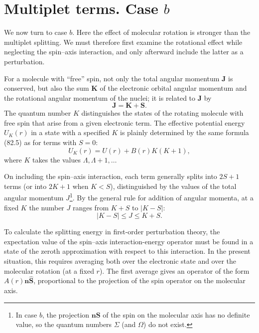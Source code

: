 \section{Multiplet terms. Case $b$}

We now turn to case $b$. Here the effect of molecular rotation is stronger than the multiplet splitting. We must therefore first examine the rotational effect while neglecting the spin--axis interaction, and only afterward include the latter as a perturbation.

For a molecule with ``free'' spin, not only the total angular momentum $\mathbf J$ is conserved, but also the sum $\mathbf K$ of the electronic orbital angular momentum and the rotational angular momentum of the nuclei; it is related to $\mathbf J$ by
\begin{equation}
 \mathbf J=\mathbf K+\mathbf S.
 \tag{84.1}
\end{equation}
The quantum number $K$ distinguishes the states of the rotating molecule with free spin that arise from a given electronic term. The effective potential energy $U_K(r)$ in a state with a specified $K$ is plainly determined by the same formula (82.5) as for terms with $S=0$:
\begin{equation}
 U_K(r)=U(r)+B(r)K(K+1),
 \tag{84.2}
\end{equation}
where $K$ takes the values $\Lambda,\Lambda+1,\ldots$

On including the spin--axis interaction, each term generally splits into $2S+1$ terms (or into $2K+1$ when $K<S$), distinguished by the values of the total angular momentum $J$\footnote{In case $b$, the projection $\mathbf n\mathbf S$ of the spin on the molecular axis has no definite value, so the quantum numbers $\Sigma$ (and $\Omega$) do not exist.}. By the general rule for addition of angular momenta, at a fixed $K$ the number $J$ ranges from $K+S$ to $|K-S|$:
\begin{equation}
 |K-S|\leqslant J\leqslant K+S.
 \tag{84.3}
\end{equation}

To calculate the splitting energy in first-order perturbation theory, the expectation value of the spin--axis interaction-energy operator must be found in a state of the zeroth approximation with respect to this interaction. In the present situation, this requires averaging both over the electronic state and over the molecular rotation (at a fixed $r$). The first average gives an operator of the form $A(r)\mathbf n\widehat{\mathbf S}$, proportional to the projection of the spin operator on the molecular axis.

